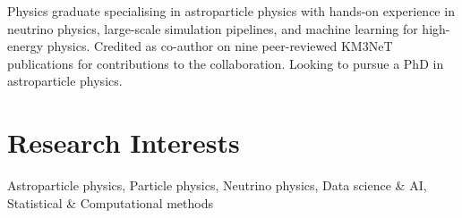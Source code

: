 Physics graduate specialising in astroparticle physics with hands-on experience in neutrino physics, large-scale simulation pipelines, and machine learning for high-energy physics. Credited as co-author on nine peer-reviewed KM3NeT publications for contributions to the collaboration. Looking to pursue a PhD in astroparticle physics.
\vspace{1.25pt}


\section{Research Interests}
  \vspace{2pt}
  \resumeSubHeadingListStart
    \small{\item{
        {Astroparticle physics, Particle physics, Neutrino physics, Data science \& AI, Statistical \& Computational methods} 
    }}
  \resumeSubHeadingListEnd